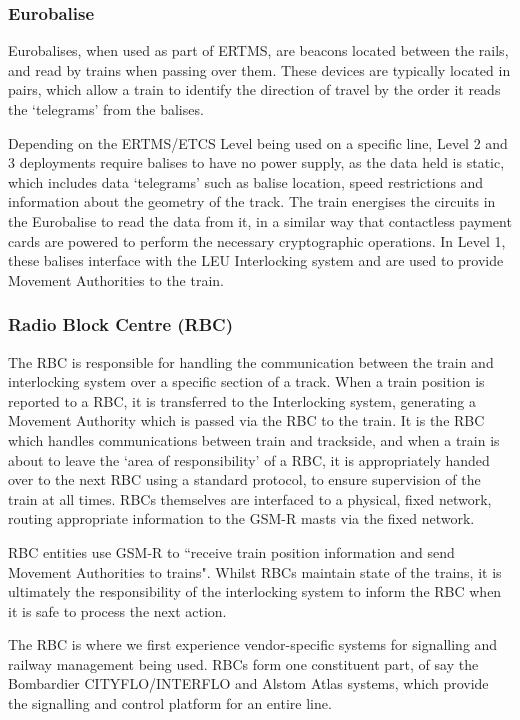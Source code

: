 \documentclass[twoside,11pt,a4paper]{article}
\begin{document}
\subsubsection{Eurobalise}
Eurobalises, when used as part of ERTMS, are beacons located between the rails, and read by trains when passing over them. These devices are typically located in pairs, which allow a train to identify the direction of travel by the order it reads the `telegrams' from the balises.

Depending on the ERTMS/ETCS Level being used on a specific line, Level 2 and 3 deployments require balises to have no power supply, as the data held is static, which includes data `telegrams' such as balise location, speed restrictions and information about the geometry of the track. The train energises the circuits in the Eurobalise to read the data from it, in a similar way that contactless payment cards are powered to perform the necessary cryptographic operations. In Level 1, these balises interface with the LEU Interlocking system and are used to provide Movement Authorities to the train.
\subsubsection{Radio Block Centre (RBC)}
The RBC is responsible for handling the communication between the train and interlocking system over a specific section of a track. When a train position is reported to a RBC, it is transferred to the Interlocking system, generating a Movement Authority which is passed via the RBC to the train\citep{Bombardier15a}. It is the RBC which handles communications between train and trackside, and when a train is about to leave the `area of responsibility' of a RBC, it is appropriately handed over to the next RBC using a standard protocol\citep[p. 9]{SUBSET039}, to ensure supervision of the train at all times. RBCs themselves are interfaced to a physical, fixed network, routing appropriate information to the GSM-R masts via the fixed network.

RBC entities use GSM-R to ``receive train position information and send Movement Authorities to trains"\citep[p. 10]{NetworkRail15a}. Whilst RBCs maintain state of the trains, it is ultimately the responsibility of the interlocking system to inform the RBC when it is safe to process the next action.

The RBC is where we first experience vendor-specific systems for signalling and railway management being used. RBCs form one constituent part, of say the Bombardier CITYFLO/INTERFLO and Alstom Atlas systems, which provide the signalling and control platform for an entire line.
\end{document}
